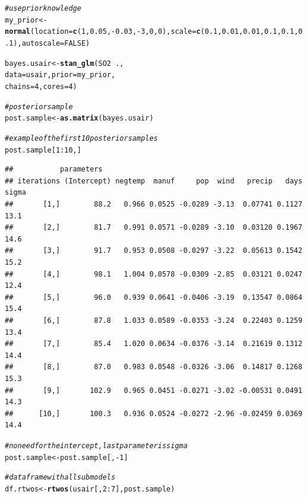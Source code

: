 \documentclass[11pt,a4paper,twoside]{book}\usepackage[]{graphicx}\usepackage[]{color}
\makeatletter
\newcommand{\hlnum}[1]{\textcolor[rgb]{0.686,0.059,0.569}{#1}}%
\newcommand{\hlcom}[1]{\textcolor[rgb]{0.678,0.584,0.686}{\textit{#1}}}%
\newcommand{\hlopt}[1]{\textcolor[rgb]{0,0,0}{#1}}%
\newcommand{\hlstd}[1]{\textcolor[rgb]{0.345,0.345,0.345}{#1}}%
\newcommand{\hlkwb}[1]{\textcolor[rgb]{0.69,0.353,0.396}{#1}}%
\newcommand{\hlkwc}[1]{\textcolor[rgb]{0.333,0.667,0.333}{#1}}%
\newcommand{\hlkwd}[1]{\textcolor[rgb]{0.737,0.353,0.396}{\textbf{#1}}}%
\newenvironment{kframe}{%
 \def\at@end@of@kframe{}%
 \ifinner\ifhmode%
  \def\at@end@of@kframe{\end{minipage}}%
  \begin{minipage}{\columnwidth}%
 \fi\fi%
 \def\FrameCommand##1{\hskip\@totalleftmargin \hskip-\fboxsep
 \colorbox{shadecolor}{##1}\hskip-\fboxsep
     \hskip-\linewidth \hskip-\@totalleftmargin \hskip\columnwidth}%
 \MakeFramed {\advance\hsize-\width
   \@totalleftmargin\z@ \linewidth\hsize
   \@setminipage}}%
 {\par\unskip\endMakeFramed%
 \at@end@of@kframe}
\newenvironment{knitrout}{}{} %
\makeatother
\begin{document}
\begin{knitrout}
\begin{kframe}\begin{alltt}
\hlcom{#use prior knowledge}
\hlstd{my_prior} \hlkwb{<-} \hlkwd{normal}\hlstd{(}\hlkwc{location} \hlstd{=} \hlkwd{c}\hlstd{(}\hlnum{1}\hlstd{,} \hlnum{0.05}\hlstd{,}\hlopt{-}\hlnum{0.03}\hlstd{,}\hlopt{-}\hlnum{3}\hlstd{,} \hlnum{0}\hlstd{,} \hlnum{0}\hlstd{),} \hlkwc{scale} \hlstd{=} \hlkwd{c}\hlstd{(}\hlnum{0.1}\hlstd{,} \hlnum{0.01}\hlstd{,}\hlnum{0.01}\hlstd{,}\hlnum{0.1}\hlstd{,} \hlnum{0.1}\hlstd{,} \hlnum{0.1}\hlstd{),} \hlkwc{autoscale} \hlstd{=} \hlnum{FALSE}\hlstd{)}


\hlstd{bayes.usair} \hlkwb{<-} \hlkwd{stan_glm}\hlstd{(SO2} \hlopt{~} \hlstd{. ,}
                  \hlkwc{data} \hlstd{= usair,} \hlkwc{prior} \hlstd{= my_prior,}
                  \hlkwc{chains} \hlstd{=} \hlnum{4}\hlstd{,} \hlkwc{cores} \hlstd{=} \hlnum{4}\hlstd{)}

\hlcom{#posterior sample}
\hlstd{post.sample} \hlkwb{<-} \hlkwd{as.matrix}\hlstd{(bayes.usair)}

\hlcom{#example of the first 10 posterior samples}
\hlstd{post.sample[}\hlnum{1}\hlopt{:}\hlnum{10}\hlstd{,]}
\end{alltt}
\begin{verbatim}
##           parameters
## iterations (Intercept) negtemp  manuf     pop  wind   precip   days sigma
##       [1,]        88.2   0.966 0.0525 -0.0289 -3.13  0.07741 0.1127  13.1
##       [2,]        81.7   0.991 0.0571 -0.0289 -3.10  0.03120 0.1967  14.6
##       [3,]        91.7   0.953 0.0508 -0.0297 -3.22  0.05613 0.1542  15.2
##       [4,]        98.1   1.004 0.0578 -0.0309 -2.85  0.03121 0.0247  12.4
##       [5,]        96.0   0.939 0.0641 -0.0406 -3.19  0.13547 0.0864  15.4
##       [6,]        87.8   1.033 0.0589 -0.0353 -3.24  0.22403 0.1259  13.4
##       [7,]        85.4   1.020 0.0634 -0.0376 -3.14  0.21619 0.1312  14.4
##       [8,]        87.0   0.983 0.0548 -0.0326 -3.06  0.14817 0.1268  15.3
##       [9,]       102.9   0.965 0.0451 -0.0271 -3.02 -0.00531 0.0491  14.3
##      [10,]       100.3   0.936 0.0524 -0.0272 -2.96 -0.02459 0.0369  14.4
\end{verbatim}
\begin{alltt}
\hlcom{#no need for the intercept, last parameter is sigma}
\hlstd{post.sample} \hlkwb{<-} \hlstd{post.sample[,}\hlopt{-}\hlnum{1}\hlstd{]}

\hlcom{#data frame with all submodels}
\hlstd{df.rtwos} \hlkwb{<-}\hlkwd{rtwos}\hlstd{(usair[,}\hlnum{2}\hlopt{:}\hlnum{7}\hlstd{], post.sample)}



\end{alltt}
\end{kframe}
\end{knitrout}
\end{document}
